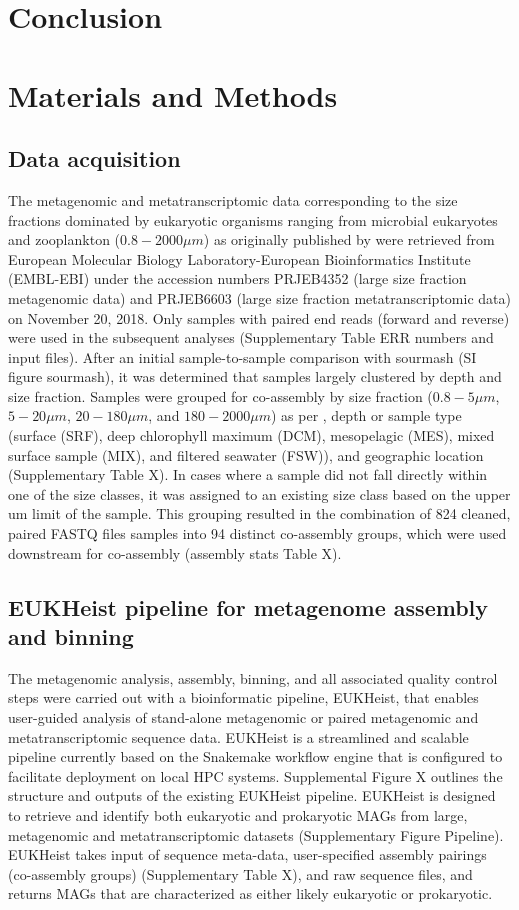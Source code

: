 \documentclass[12pt]{article}
\numberwithin{equation}{section}
\begin{document}
\section*{Conclusion}
\section*{Materials and Methods}

\subsection*{Data acquisition} The metagenomic and metatranscriptomic data corresponding to the size fractions dominated by eukaryotic organisms ranging from ﻿microbial eukaryotes and zooplankton ($0.8 -  2000 \mu m$) as originally published by \citet{Carradec2018global} were retrieved from ﻿European Molecular Biology Laboratory-European Bioinformatics Institute (EMBL-EBI) under the accession numbers PRJEB4352 (large size fraction metagenomic data) and PRJEB6603 (large size fraction metatranscriptomic data) on November 20, 2018. Only samples with paired end reads (forward and reverse) were used in the subsequent analyses (Supplementary Table ERR numbers and input files). After an initial sample-to-sample comparison with sourmash (SI figure sourmash), it was determined that samples largely clustered by depth and size fraction. Samples were grouped for co-assembly by size fraction ($0.8 - 5 \mu m$, $5-20 \mu m$, $20-180 \mu m$, and $180-2000 \mu m$) as per \citet{Carradec2018global}, depth or sample type (surface (SRF), deep chlorophyll maximum (DCM), mesopelagic (MES), mixed surface sample (MIX), and filtered seawater (FSW)), and geographic location (Supplementary Table X). In cases where a sample did not fall directly within one of the size classes, it was assigned to an existing size class based on the upper um limit of the sample. This grouping resulted in the combination of 824 cleaned, paired FASTQ files samples into 94 distinct co-assembly groups, which were used downstream for co-assembly (assembly stats Table X). 

\subsection*{EUKHeist pipeline for metagenome assembly and binning}The metagenomic analysis, assembly, binning, and all associated quality control steps were carried out with a bioinformatic pipeline, EUKHeist, that enables user-guided analysis of stand-alone metagenomic or paired metagenomic and metatranscriptomic sequence data. EUKHeist is a streamlined and scalable pipeline currently based on the Snakemake workflow engine \citep{Koster2012} that is configured to facilitate deployment on local HPC systems.  Supplemental Figure X outlines the structure and outputs of the existing EUKHeist pipeline. EUKHeist is designed to retrieve and identify both eukaryotic and prokaryotic MAGs from large, metagenomic and metatranscriptomic datasets (Supplementary Figure Pipeline). EUKHeist takes input of sequence meta-data, user-specified assembly pairings (co-assembly groups) (Supplementary Table X), and raw sequence files, and returns MAGs that are characterized as either likely eukaryotic or prokaryotic. 
\end{document}
